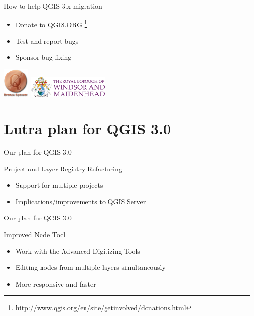 \begin{frame}{How to help QGIS 3.x migration}
\begin{block}{}
	\begin{itemize}
		\item Donate to QGIS.ORG \footnote{http://www.qgis.org/en/site/getinvolved/donations.html}
		\item Test and report bugs
		\item Sponsor bug fixing
	\end{itemize}
\end{block}
\includegraphics[width=0.1\textwidth]{bronze.png} \includegraphics[width=0.3\textwidth]{windsor.png} 
\end{frame}


\section{Lutra plan for QGIS 3.0}
\begin{frame}{Our plan for QGIS 3.0}
	\begin{block}{Project and Layer Registry Refactoring}
		\begin{itemize}
			\item Support for multiple projects
			\item Implications/improvements to QGIS Server
		\end{itemize}
	\end{block}
\end{frame}

\begin{frame}{Our plan for QGIS 3.0}
	\begin{block}{Improved Node Tool}
		\begin{itemize}
			\item Work with the Advanced Digitizing Tools 
			\item Editing nodes from multiple layers simultaneously
			\item More responsive and faster
		\end{itemize}
	\end{block}
\end{frame}

